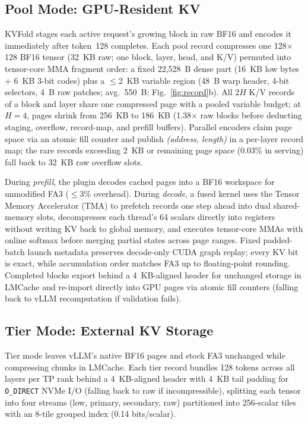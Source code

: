 \documentclass[conference]{IEEEtran}
\begin{document}
\subsection{Pool Mode: GPU-Resident KV}
\label{sec:pool}
KVFold stages each active request's growing block in raw BF16 and encodes it
immediately after token~128 completes. Each pool record
compresses one 128$\times$128 BF16 tensor (32~KB raw; one block, layer, head,
and K/V) permuted into tensor-core MMA fragment order: a fixed 22,528~B dense
part (16~KB low bytes + 6~KB 3-bit codes) plus a $\le$2~KB variable region
(48~B warp header, 4-bit selectors, 4~B raw patches; avg.\ 550~B;
Fig.~\ref{fig:record}b). All $2H$ K/V records of a block and layer share one
compressed page with a pooled variable budget; at $H{=}4$, pages shrink from
256~KB to 186~KB (1.38$\times$ raw blocks before deducting staging, overflow,
record-map, and prefill buffers). Parallel encoders claim page space via an
atomic fill counter and publish \emph{(address, length)} in a per-layer record
map; the rare records exceeding 2~KB or remaining page space (0.03\% in
serving) fall back to 32~KB raw overflow slots.

During \emph{prefill}, the plugin decodes cached pages into a BF16 workspace
for unmodified FA3 ($\le$3\% overhead). During \emph{decode}, a fused kernel
uses the Tensor Memory Accelerator (TMA) to prefetch records one step ahead
into dual shared-memory slots, decompresses each thread's 64 scalars directly
into registers without writing KV back to global memory, and executes
tensor-core MMAs with online softmax before merging partial states across page
ranges. Fixed padded-batch launch metadata preserves decode-only CUDA graph
replay; every KV bit is exact, while accumulation order matches FA3 up to
floating-point rounding. Completed blocks export behind a 4~KB-aligned header
for unchanged storage in LMCache and re-import directly into GPU pages via
atomic fill counters (falling back to vLLM recomputation if validation fails).

\subsection{Tier Mode: External KV Storage}
\label{sec:tier}
Tier mode leaves vLLM's native BF16 pages and stock FA3 unchanged while
compressing chunks in LMCache. Each tier record bundles 128 tokens across all
layers per TP rank behind a 4~KB-aligned header with 4~KB tail padding for
\texttt{O\_DIRECT} NVMe I/O (falling back to raw if incompressible), splitting
each tensor into four streams (low, primary, secondary, raw) partitioned into
256-scalar tiles with an 8-tile grouped index (0.14 bits/scalar).
\end{document}
